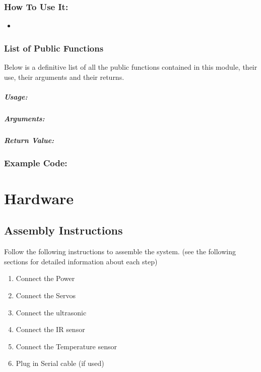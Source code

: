 \documentclass[]{report}
\begin{document}
\section{How To Use It:}
\begin{itemize}
	\item 
\end{itemize}

\section{List of Public Functions}
Below is a definitive list of all the public functions contained in this module, their use, their arguments and their returns.

\subsection{}
\subsubsection{Usage:}

\subsubsection{Arguments:}

\subsubsection{Return Value:}

\section{Example Code:}

\part{Hardware}
\chapter{Assembly Instructions}
Follow the following instructions to assemble the system. (see the following sections for detailed information about each step)

\begin{enumerate}
	\item Connect the Power
	\item Connect the Servos
	\item Connect the ultrasonic
	\item Connect the IR sensor
	\item Connect the Temperature sensor
	\item Plug in Serial cable (if used)
\end{enumerate}
\end{document}

